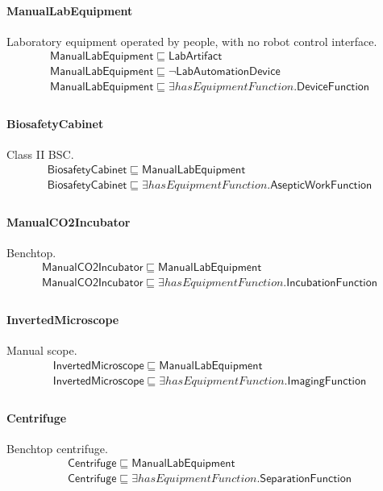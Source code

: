\documentclass[10pt]{article}
\begin{document}
\paragraph{ManualLabEquipment} Laboratory equipment operated by people, with no robot control interface.
\[\begin{array}{l}
\mathsf{ManualLabEquipment} \sqsubseteq  \mathsf{LabArtifact} \\
\mathsf{ManualLabEquipment} \sqsubseteq  \neg \mathsf{LabAutomationDevice} \\
\mathsf{ManualLabEquipment} \sqsubseteq  \exists \mathit{hasEquipmentFunction}.\mathsf{DeviceFunction} \\
\end{array}\]
\paragraph{BiosafetyCabinet} Class II BSC.
\[\begin{array}{l}
\mathsf{BiosafetyCabinet} \sqsubseteq  \mathsf{ManualLabEquipment} \\
\mathsf{BiosafetyCabinet} \sqsubseteq  \exists \mathit{hasEquipmentFunction}.\mathsf{AsepticWorkFunction} \\
\end{array}\]
\paragraph{ManualCO2Incubator} Benchtop.
\[\begin{array}{l}
\mathsf{ManualCO2Incubator} \sqsubseteq  \mathsf{ManualLabEquipment} \\
\mathsf{ManualCO2Incubator} \sqsubseteq  \exists \mathit{hasEquipmentFunction}.\mathsf{IncubationFunction} \\
\end{array}\]
\paragraph{InvertedMicroscope} Manual scope.
\[\begin{array}{l}
\mathsf{InvertedMicroscope} \sqsubseteq  \mathsf{ManualLabEquipment} \\
\mathsf{InvertedMicroscope} \sqsubseteq  \exists \mathit{hasEquipmentFunction}.\mathsf{ImagingFunction} \\
\end{array}\]
\paragraph{Centrifuge} Benchtop centrifuge.
\[\begin{array}{l}
\mathsf{Centrifuge} \sqsubseteq  \mathsf{ManualLabEquipment} \\
\mathsf{Centrifuge} \sqsubseteq  \exists \mathit{hasEquipmentFunction}.\mathsf{SeparationFunction} \\
\end{array}\]
\end{document}
